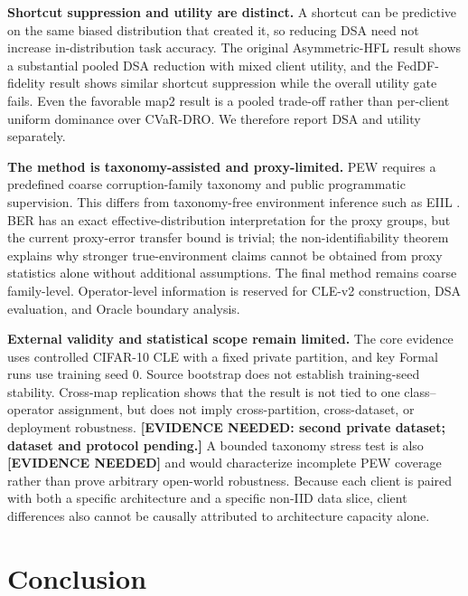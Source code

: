 \documentclass[10pt,twocolumn]{article}
\begin{document}
\textbf{Shortcut suppression and utility are distinct.} A shortcut can be predictive on the same biased distribution that created it, so reducing DSA need not increase in-distribution task accuracy. The original Asymmetric-HFL result shows a substantial pooled DSA reduction with mixed client utility, and the FedDF-fidelity result shows similar shortcut suppression while the overall utility gate fails. Even the favorable map2 result is a pooled trade-off rather than per-client uniform dominance over CVaR-DRO. We therefore report DSA and utility separately.

\textbf{The method is taxonomy-assisted and proxy-limited.} PEW requires a predefined coarse corruption-family taxonomy and public programmatic supervision. This differs from taxonomy-free environment inference such as EIIL \citep{creager2021eiil}. BER has an exact effective-distribution interpretation for the proxy groups, but the current proxy-error transfer bound is trivial; the non-identifiability theorem explains why stronger true-environment claims cannot be obtained from proxy statistics alone without additional assumptions. The final method remains coarse family-level. Operator-level information is reserved for CLE-v2 construction, DSA evaluation, and Oracle boundary analysis.

\textbf{External validity and statistical scope remain limited.} The core evidence uses controlled CIFAR-10 CLE with a fixed private partition, and key Formal runs use training seed 0. Source bootstrap does not establish training-seed stability. Cross-map replication shows that the result is not tied to one class--operator assignment, but does not imply cross-partition, cross-dataset, or deployment robustness. \textbf{[EVIDENCE NEEDED: second private dataset; dataset and protocol pending.]} A bounded taxonomy stress test is also \textbf{[EVIDENCE NEEDED]} and would characterize incomplete PEW coverage rather than prove arbitrary open-world robustness. Because each client is paired with both a specific architecture and a specific non-IID data slice, client differences also cannot be causally attributed to architecture capacity alone.

\section{Conclusion}
\end{document}
